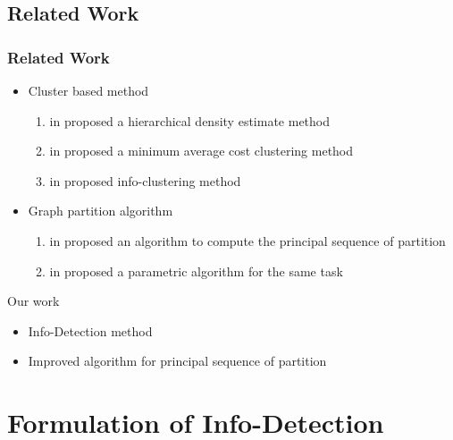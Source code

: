 \documentclass[notheorems]{beamer}
\begin{document}
\subsection{Related Work}
\begin{frame}
	\frametitle{Related Work}
\begin{itemize}
\item Cluster based method
	\begin{enumerate}
		\item \citeauthor{de} in \citeyear{de} proposed a hierarchical density estimate method 
		\item \citeauthor{mac} in \citeyear{mac} proposed a minimum average cost clustering method 
		\item \citeauthor{ic} in \citeyear{ic} proposed info-clustering method
	\end{enumerate}
\item Graph partition algorithm
\begin{enumerate}
\item \citeauthor{psp} in \citeyear{psp} proposed an algorithm to compute the principal sequence of partition 
\item \citeauthor{pmf} in \citeyear{pmf} proposed a parametric algorithm for the same task 
\end{enumerate}
\end{itemize}
Our work
\begin{itemize}
\item Info-Detection method
\item Improved algorithm for principal sequence of partition
\end{itemize}
\end{frame}
\section{Formulation of Info-Detection}
\end{document}
